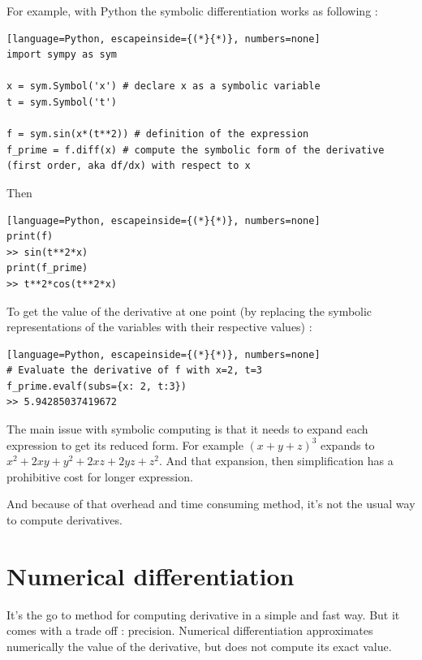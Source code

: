 \documentclass[12pt]{article}
\begin{document}
For example, with Python the symbolic differentiation works as following :

\begin{lstlisting}[language=Python, escapeinside={(*}{*)}, numbers=none]
import sympy as sym

x = sym.Symbol('x') # declare x as a symbolic variable
t = sym.Symbol('t')

f = sym.sin(x*(t**2)) # definition of the expression
f_prime = f.diff(x) # compute the symbolic form of the derivative (first order, aka df/dx) with respect to x
\end{lstlisting}

Then

\begin{lstlisting}[language=Python, escapeinside={(*}{*)}, numbers=none]
print(f)
>> sin(t**2*x)
print(f_prime)
>> t**2*cos(t**2*x)
\end{lstlisting}

To get the value of the derivative at one point (by replacing the symbolic representations of the variables with their respective values) :

\begin{lstlisting}[language=Python, escapeinside={(*}{*)}, numbers=none]
# Evaluate the derivative of f with x=2, t=3
f_prime.evalf(subs={x: 2, t:3})
>> 5.94285037419672
\end{lstlisting}

The main issue with symbolic computing is that it needs to expand each expression to get its reduced form. For example $(x+y+z)^3$ expands to $x^2+2xy+y^2+2xz+2yz+z^2$. And that expansion, then simplification has a prohibitive cost for longer expression.

And because of that overhead and time consuming method, it's not the usual way to compute derivatives.

%
%


\section{Numerical differentiation}

It's the go to method for computing derivative in a simple and fast way. But it comes with a trade off : precision. Numerical differentiation approximates numerically the value of the derivative, but does not compute its exact value.
\end{document}
